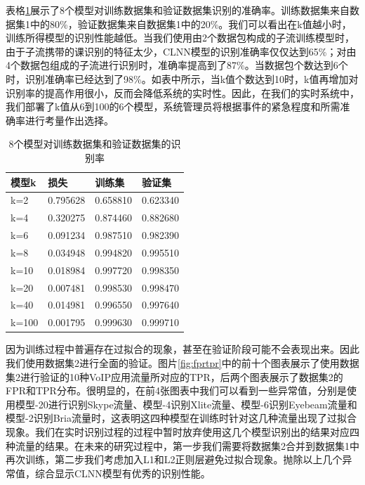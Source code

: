 表格\ref{tab:acc4models}展示了8个模型对训练数据集和验证数据集识别的准确率。训练数据集来自数据集1中的80\%，验证数据集来自数据集1中的20\%。我们可以看出在k值越小时，训练所得模型的识别性能越低。当我们使用由2个数据包构成的子流训练模型时，由于子流携带的课识别的特征太少，CLNN模型的识别准确率仅仅达到65\%；对由4个数据包组成的子流进行识别时，准确率提高到了87\%。当数据包个数达到6个时，识别准确率已经达到了98\%。如表中所示，当k值个数达到10时，k值再增加对识别率的提高作用很小，反而会降低系统的实时性。因此，在我们的实时系统中，我们部署了k值从6到100的6个模型，系统管理员将根据事件的紧急程度和所需准确率进行考量作出选择。
\begin{table}
  \caption{8个模型对训练数据集和验证数据集的识别率}
  \label{tab:acc4models}
  \centering
  \begin{tabular}{l l l l}
    \hline
    \textbf{模型k} & \textbf{损失} & \textbf{训练集}&\textbf{验证集}\\
    \hline
    k=2      & 0.795628  & 0.658810  &0.623340  \\
    k=4      & 0.320275  & 0.874460  &0.882680 \\
    k=6      & 0.091234  & 0.987510  &0.982390 \\
    k=8      & 0.034948  & 0.994820  &0.995510 \\
    k=10     & 0.018984  & 0.997720  &0.998350  \\
    k=20     & 0.007481  & 0.998530  &0.998470 \\
    k=40     & 0.014981  & 0.996550  &0.997640  \\
    k=100    & 0.001795  & 0.999630  &0.999710  \\
    \hline
  \end{tabular}
\end{table}

因为训练过程中普遍存在过拟合的现象，甚至在验证阶段可能不会表现出来。因此我们使用数据集2进行全面的验证。图片\ref{fig:fprtpr}中的前十个图表展示了使用数据集2进行验证的10种VoIP应用流量所对应的TPR，后两个图表展示了数据集2的FPR和TPR分布。很明显的，在前4张图表中我们可以看到一些异常值，分别是使用模型-20进行识别Skype流量、模型-4识别Xlite流量、模型-6识别Eyebeam流量和模型-2识别Bria流量时，这表明这四种模型在训练时针对这几种流量出现了过拟合现象。我们在实时识别过程的过程中暂时放弃使用这几个模型识别出的结果对应四种流量的结果。在未来的研究过程中，第一步我们需要将数据集2合并到数据集1中再次训练，第二步我们考虑加入L1和L2正则层避免过拟合现象。抛除以上几个异常值，综合显示CLNN模型有优秀的识别性能。


